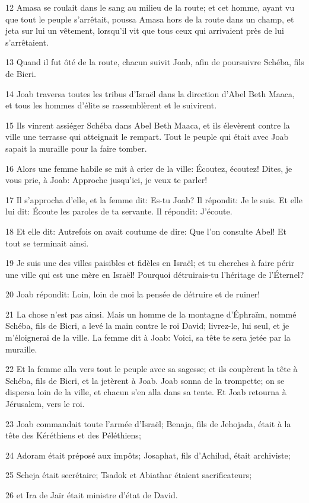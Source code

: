 \par 12 Amasa se roulait dans le sang au milieu de la route; et cet homme, ayant vu que tout le peuple s'arrêtait, poussa Amasa hors de la route dans un champ, et jeta sur lui un vêtement, lorsqu'il vit que tous ceux qui arrivaient près de lui s'arrêtaient.
\par 13 Quand il fut ôté de la route, chacun suivit Joab, afin de poursuivre Schéba, fils de Bicri.
\par 14 Joab traversa toutes les tribus d'Israël dans la direction d'Abel Beth Maaca, et tous les hommes d'élite se rassemblèrent et le suivirent.
\par 15 Ils vinrent assiéger Schéba dans Abel Beth Maaca, et ils élevèrent contre la ville une terrasse qui atteignait le rempart. Tout le peuple qui était avec Joab sapait la muraille pour la faire tomber.
\par 16 Alors une femme habile se mit à crier de la ville: Écoutez, écoutez! Dites, je vous prie, à Joab: Approche jusqu'ici, je veux te parler!
\par 17 Il s'approcha d'elle, et la femme dit: Es-tu Joab? Il répondit: Je le suis. Et elle lui dit: Écoute les paroles de ta servante. Il répondit: J'écoute.
\par 18 Et elle dit: Autrefois on avait coutume de dire: Que l'on consulte Abel! Et tout se terminait ainsi.
\par 19 Je suis une des villes paisibles et fidèles en Israël; et tu cherches à faire périr une ville qui est une mère en Israël! Pourquoi détruirais-tu l'héritage de l'Éternel?
\par 20 Joab répondit: Loin, loin de moi la pensée de détruire et de ruiner!
\par 21 La chose n'est pas ainsi. Mais un homme de la montagne d'Éphraïm, nommé Schéba, fils de Bicri, a levé la main contre le roi David; livrez-le, lui seul, et je m'éloignerai de la ville. La femme dit à Joab: Voici, sa tête te sera jetée par la muraille.
\par 22 Et la femme alla vers tout le peuple avec sa sagesse; et ils coupèrent la tête à Schéba, fils de Bicri, et la jetèrent à Joab. Joab sonna de la trompette; on se dispersa loin de la ville, et chacun s'en alla dans sa tente. Et Joab retourna à Jérusalem, vers le roi.
\par 23 Joab commandait toute l'armée d'Israël; Benaja, fils de Jehojada, était à la tête des Kéréthiens et des Péléthiens;
\par 24 Adoram était préposé aux impôts; Josaphat, fils d'Achilud, était archiviste;
\par 25 Scheja était secrétaire; Tsadok et Abiathar étaient sacrificateurs;
\par 26 et Ira de Jaïr était ministre d'état de David.

